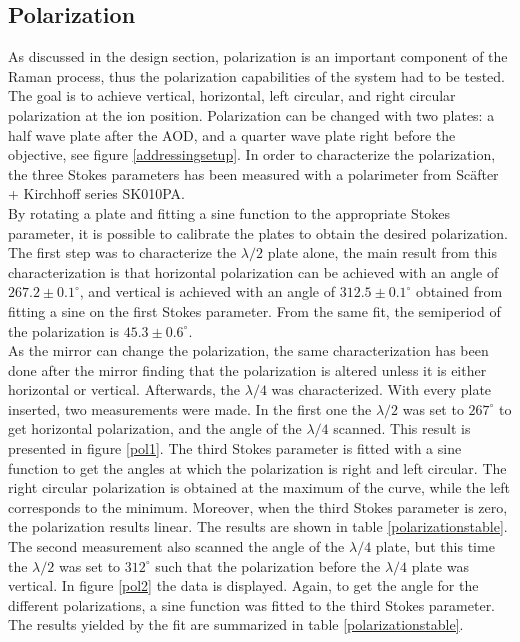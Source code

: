 \subsection{Polarization}
\label{sec:polarization}
As discussed in the design section, polarization is an important component of the Raman process, thus the polarization capabilities of the system had to be tested. The goal is to achieve vertical, horizontal, left circular, and right circular polarization at the ion position. Polarization can be changed with two plates: a half wave plate after the AOD, and a quarter wave plate right before the objective, see figure \ref{addressingsetup}. In order to characterize the polarization, the three Stokes parameters \cite{stokes} has been measured with a polarimeter from Sc\"after + Kirchhoff series SK010PA.\\
By rotating a plate and fitting a sine function to the appropriate Stokes parameter, it is possible to calibrate the plates to obtain the desired polarization. The first step was to characterize the $\lambda/2$ plate alone, the main result from this characterization is that horizontal polarization can be achieved with an angle of $267.2\pm 0.1 ^{\circ}$, and vertical is achieved with an angle of $312.5\pm0.1^{\circ}$ obtained from fitting a sine on the first Stokes parameter. From the same fit, the semiperiod of the polarization is $45.3\pm 0.6^\circ$.\\
As the mirror can change the polarization, the same characterization has been done after the mirror finding that the polarization is altered unless it is either horizontal or vertical. Afterwards, the $\lambda/4$ was characterized. With every plate inserted, two measurements were made. In the first one the $\lambda/2$ was set to $267^\circ$ to get horizontal polarization, and the angle of the $\lambda/4$ scanned. This result is presented in figure \ref{pol1}. The third Stokes parameter is fitted with a sine function to get the angles at which the polarization is right and left circular. The right circular polarization is obtained at the maximum of the curve, while the left corresponds to the minimum. Moreover, when the third Stokes parameter is zero, the polarization results linear. The results are shown in table \ref{polarizationstable}.
The second measurement also scanned the angle of the $\lambda/4$ plate, but this time the $\lambda/2$ was set to $312^\circ$ such that the polarization before the $\lambda/4$ plate was vertical. In figure \ref{pol2} the data is displayed. Again, to get the angle for the different polarizations, a sine function was fitted to the third Stokes parameter. The results yielded by the fit are summarized in table \ref{polarizationstable}.

